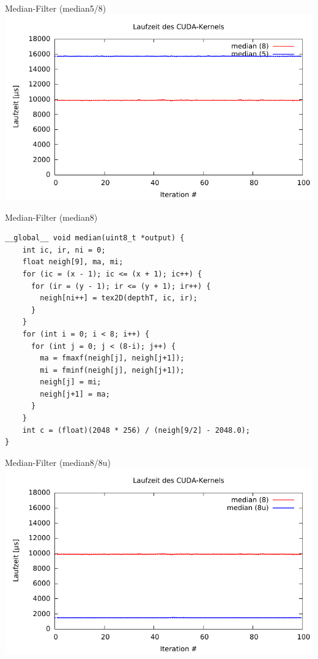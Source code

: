 \documentclass[compress]{beamer}
\begin{document}
\begin{frame}[fragile]{Median-Filter (median5/8)}
\includegraphics[width=\textwidth]{median58.pdf}
\end{frame}

\begin{frame}[fragile]{Median-Filter (median8)}
\begin{lstlisting}
__global__ void median(uint8_t *output) {
    int ic, ir, ni = 0;
    float neigh[9], ma, mi;
    for (ic = (x - 1); ic <= (x + 1); ic++) {
      for (ir = (y - 1); ir <= (y + 1); ir++) {
        neigh[ni++] = tex2D(depthT, ic, ir);
      }
    }
    for (int i = 0; i < 8; i++) {
      for (int j = 0; j < (8-i); j++) {
        ma = fmaxf(neigh[j], neigh[j+1]);
        mi = fminf(neigh[j], neigh[j+1]);
        neigh[j] = mi;
        neigh[j+1] = ma;
      }
    }
    int c = (float)(2048 * 256) / (neigh[9/2] - 2048.0);
}
\end{lstlisting}
\end{frame}


\begin{frame}[fragile]{Median-Filter (median8/8u)}
\includegraphics[width=\textwidth]{median88u.pdf}
\end{frame}
\end{document}
